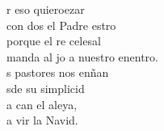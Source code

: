 \documentclass[12pt]{article}
\begin{document}
\begin{multicols*}{2}
\begin{cancion}
	\begin{chorus}%
	r eso quieroezar\\
	con dos el Padre estro\\
	porque el re celesal\\
	manda al jo a nuestro enentro.\\
	s pastores nos enñan\\
	sde su simplicid\\
	a can el aleya,\\
	a vir la Navid.\\
	\end{chorus}%
	\jump\\
\end{cancion}%


\end{multicols*}
\end{document}
